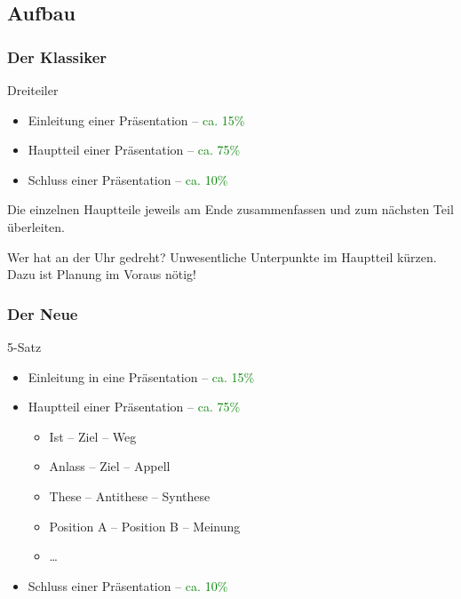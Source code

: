 \subsection{Aufbau}
\begin{frame}
\frametitle{Der Klassiker}
\begin{block}{Dreiteiler}
\begin{itemize}
	\item{Einleitung einer Präsentation \quad -- \textcolor{green}{ca. 15\%}}
	\item{Hauptteil einer Präsentation \quad -- \textcolor{green}{ca. 75\%}}
	\item{Schluss einer Präsentation \qquad -- \textcolor{green}{ca. 10\%}}
\end{itemize}
Die einzelnen Hauptteile jeweils am Ende zusammenfassen und zum nächsten Teil überleiten.
\end{block}
\vspace{1cm}
\begin{alertblock}{Wer hat an der Uhr gedreht?}
Unwesentliche Unterpunkte im Hauptteil kürzen. Dazu ist Planung im Voraus nötig!
\end{alertblock}
\end{frame}


\begin{frame}
\frametitle{Der Neue}
\begin{block}{5-Satz}
\begin{itemize}
	\item{Einleitung in eine Präsentation \quad -- \textcolor{green}{ca. 15\%}}
	\item{Hauptteil einer Präsentation \qquad -- \textcolor{green}{ca. 75\%}}
	\begin{itemize}
		\item<2->{Ist -- Ziel -- Weg}
		\item<2->{Anlass -- Ziel -- Appell}
		\item<2->{These -- Antithese -- Synthese}
		\item<2->{Position A -- Position B -- Meinung}
		\item<2->{\dots}
	\end{itemize}
	\item{Schluss einer Präsentation \qquad -- \textcolor{green}{ca. 10\%}}
\end{itemize}
\end{block}
\end{frame}
